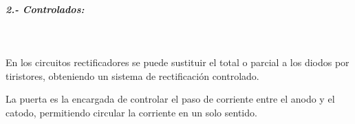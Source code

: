 \documentclass[12pt,letterpaper]{article}
\begin{document}
\

\



\

\subparagraph{2.- Controlados:}
\

En los circuitos rectificadores se puede sustituir el total o parcial a los diodos por tiristores, obteniendo un sistema de rectificación controlado.
\

La puerta es la encargada de controlar el paso de corriente entre el anodo y el catodo, permitiendo circular la corriente en un solo sentido.

\
\end{document}
